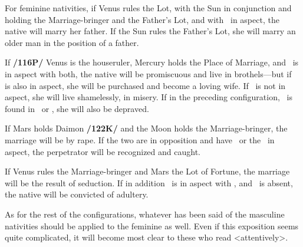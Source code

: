 For feminine nativities, if Venus rules the Lot, with the Sun in conjunction and holding the Marriage-bringer and the Father’s Lot, and with \Saturn\, in aspect, the native will marry her father. If the Sun rules the Father’s Lot, she will marry an older man in the position of a father. 

If \textbf{/116P/} Venus is the houseruler, Mercury holds the Place of Marriage, and \Saturn\, is in aspect with both, the native will be
promiscuous and live in brothels—but if \Jupiter\, is also in aspect, she will be purchased and become a loving wife. If \Jupiter\, is not in aspect, she will live shamelessly, in misery.  If in the preceding configuration, \Venus\, is found in \Pisces\, or \Capricorn, she will also be depraved. 

If Mars holds Daimon \textbf{/122K/} and the Moon holds the Marriage-bringer, the marriage will be by rape. If the two are in opposition and have \Saturn\, or the \Sun\, in aspect, the perpetrator will be recognized and caught. 

If Venus rules the Marriage-bringer and Mars the Lot of Fortune, the marriage will be the result of seduction. If in addition \Saturn\, is in aspect with \Mercury, and \Jupiter\, is absent, the native will be convicted of adultery.

As for the rest of the configurations, whatever has been said of the masculine nativities should be applied to the feminine as well. Even if this exposition seems quite complicated, it will become most clear to these who read <attentively>.

\newpage